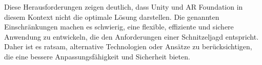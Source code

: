 Diese Herausforderungen zeigen deutlich, dass Unity und AR Foundation in diesem Kontext nicht die optimale Lösung darstellen. Die genannten Einschränkungen machen es schwierig, eine flexible, effiziente und sichere Anwendung zu entwickeln, die den Anforderungen einer Schnitzeljagd entspricht. Daher ist es ratsam, alternative Technologien oder Ansätze zu berücksichtigen, die eine bessere Anpassungsfähigkeit und Sicherheit bieten.




%


